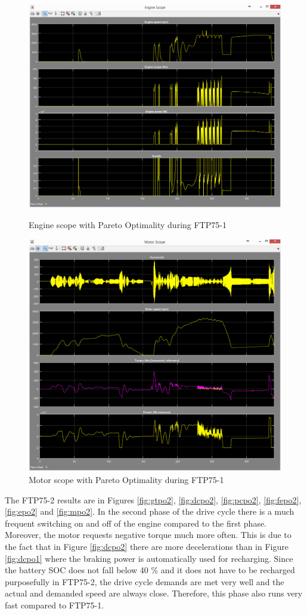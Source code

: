 \begin{figure}[hp]
\centering
\includegraphics[scale=0.42]{figures/Pareto/FTP75-1/engine30Juni}
\caption{Engine scope with Pareto Optimality during FTP75-1}
\label{fig:epo1}
\includegraphics[scale=0.42]{figures/Pareto/FTP75-1/motor30Juni}
\caption{Motor scope with Pareto Optimality during FTP75-1}
\label{fig:mpo1}
\end{figure}

The FTP75-2 results are in Figures \ref{fig:gtpo2}, \ref{fig:dcpo2}, \ref{fig:pcpo2}, \ref{fig:fepo2}, \ref{fig:epo2} and \ref{fig:mpo2}. In the second phase of the drive cycle there is a much frequent switching on and off of the engine compared to the first phase. Moreover, the motor requests negative torque much more often. This is due to the fact that in Figure \ref{fig:dcpo2} there are more decelerations than in Figure \ref{fig:dcpo1} where the braking power is automatically used for recharging. Since the battery SOC does not fall below 40 \% and it does not have to be recharged purposefully in FTP75-2, the drive cycle demands are met very well and the actual and demanded speed are always close. Therefore, this phase also runs very fast compared to FTP75-1.

